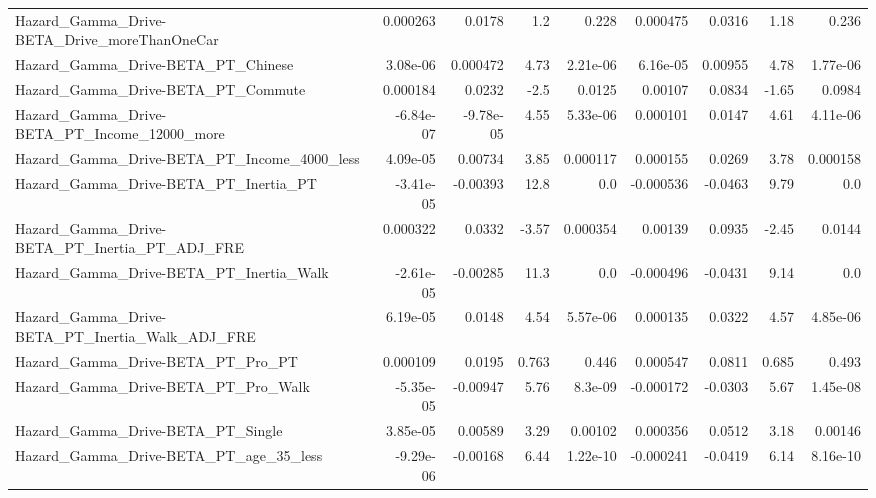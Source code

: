 \begin{tabular}{lrrrrrrrr}
Hazard\_Gamma\_Drive-BETA\_Drive\_moreThanOneCar       &    0.000263 &       0.0178 &      1.2 &    0.228 &   0.000475 &      0.0316 &         1.18 &         0.236 \\
Hazard\_Gamma\_Drive-BETA\_PT\_Chinese                 &    3.08e-06 &     0.000472 &     4.73 & 2.21e-06 &   6.16e-05 &     0.00955 &         4.78 &      1.77e-06 \\
Hazard\_Gamma\_Drive-BETA\_PT\_Commute                 &    0.000184 &       0.0232 &     -2.5 &   0.0125 &    0.00107 &      0.0834 &        -1.65 &        0.0984 \\
Hazard\_Gamma\_Drive-BETA\_PT\_Income\_12000\_more       &   -6.84e-07 &    -9.78e-05 &     4.55 & 5.33e-06 &   0.000101 &      0.0147 &         4.61 &      4.11e-06 \\
Hazard\_Gamma\_Drive-BETA\_PT\_Income\_4000\_less        &    4.09e-05 &      0.00734 &     3.85 & 0.000117 &   0.000155 &      0.0269 &         3.78 &      0.000158 \\
Hazard\_Gamma\_Drive-BETA\_PT\_Inertia\_PT              &   -3.41e-05 &     -0.00393 &     12.8 &      0.0 &  -0.000536 &     -0.0463 &         9.79 &           0.0 \\
Hazard\_Gamma\_Drive-BETA\_PT\_Inertia\_PT\_ADJ\_FRE      &    0.000322 &       0.0332 &    -3.57 & 0.000354 &    0.00139 &      0.0935 &        -2.45 &        0.0144 \\
Hazard\_Gamma\_Drive-BETA\_PT\_Inertia\_Walk            &   -2.61e-05 &     -0.00285 &     11.3 &      0.0 &  -0.000496 &     -0.0431 &         9.14 &           0.0 \\
Hazard\_Gamma\_Drive-BETA\_PT\_Inertia\_Walk\_ADJ\_FRE    &    6.19e-05 &       0.0148 &     4.54 & 5.57e-06 &   0.000135 &      0.0322 &         4.57 &      4.85e-06 \\
Hazard\_Gamma\_Drive-BETA\_PT\_Pro\_PT                  &    0.000109 &       0.0195 &    0.763 &    0.446 &   0.000547 &      0.0811 &        0.685 &         0.493 \\
Hazard\_Gamma\_Drive-BETA\_PT\_Pro\_Walk                &   -5.35e-05 &     -0.00947 &     5.76 &  8.3e-09 &  -0.000172 &     -0.0303 &         5.67 &      1.45e-08 \\
Hazard\_Gamma\_Drive-BETA\_PT\_Single                  &    3.85e-05 &      0.00589 &     3.29 &  0.00102 &   0.000356 &      0.0512 &         3.18 &       0.00146 \\
Hazard\_Gamma\_Drive-BETA\_PT\_age\_35\_less             &   -9.29e-06 &     -0.00168 &     6.44 & 1.22e-10 &  -0.000241 &     -0.0419 &         6.14 &      8.16e-10 \\

\end{tabular}
